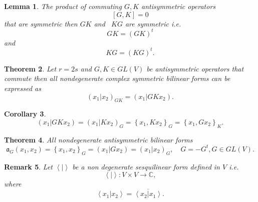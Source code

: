 \documentclass[aps,preprint]{revtex4}%
\newtheorem{theorem}{Theorem}
\newtheorem{corollary}[theorem]{Corollary}
\newtheorem{lemma}[theorem]{Lemma}
\newtheorem{remark}[theorem]{Remark}
\begin{document}
\begin{lemma}
The product of commuting $G,K$ antisymmetric operators
\begin{equation}
\left[  G,K\right]  =0
\end{equation}
that are symmetric then $GK$ and \ $KG$ are symmetric i.e.
\begin{equation}
GK=\left(  GK\right)  ^{t}%
\end{equation}
and
\begin{equation}
KG=\left(  KG\right)  ^{t}.
\end{equation}

\end{lemma}

\begin{theorem}
Let $r=2s$ and $G,K\in GL\left(  V\right)  $ be antisymmetric operators that
commute then all \emph{nondegenerate} complex \emph{symmetric} bilinear forms
can be expressed as
\begin{equation}
\left(  \left.  x_{1}\right\vert x_{2}\right)  _{GK}=\left(  \left.
x_{1}\right\vert GKx_{2}\right)  .
\end{equation}

\end{theorem}

\begin{corollary}%
\begin{equation}
\left(  \left.  x_{1}\right\vert GKx_{2}\right)  =\left(  \left.
x_{1}\right\vert Kx_{2}\right)  _{G}=\left\{  x_{1},Kx_{2}\right\}
_{G}=\left\{  x_{1},Gx_{2}\right\}  _{K}.
\end{equation}

\end{corollary}

\begin{theorem}
All nondegenerate antisymmetric bilinear forms
\begin{equation}
\mathfrak{a}_{G}\left(  x_{1},x_{2}\right)  =\left\{  x_{1},x_{2}\right\}
_{G}=\left(  \left.  x_{1}\right\vert Gx_{2}\right)  =\left(  \left.
x_{1}\right\vert x_{2}\right)  _{G},\quad G=-G^{t},G\in GL\left(  V\right)  .
\end{equation}

\end{theorem}

\begin{remark}
Let $\left\langle \left.  {}\right\vert \right\rangle $ be a non degenerate
sesquilinear form defined in $V$ i.e.
\begin{equation}
\left\langle \left.  {}\right\vert \right\rangle :V\times V\rightarrow
\mathbb{C},
\end{equation}
where
\begin{equation}
\left\langle \left.  x_{1}\right\vert x_{2}\right\rangle =\overline
{\left\langle \left.  x_{2}\right\vert x_{1}\right\rangle }.
\end{equation}

\end{remark}
\end{document}
